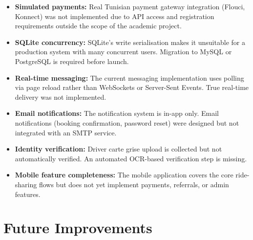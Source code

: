 \documentclass[12pt,a4paper,openright]{report}
\begin{document}
\begin{itemize}[noitemsep]
    \item \textbf{Simulated payments:} Real Tunisian payment gateway integration (Flouci, Konnect) was not implemented due to API access and registration requirements outside the scope of the academic project.
    \item \textbf{SQLite concurrency:} SQLite's write serialisation makes it unsuitable for a production system with many concurrent users. Migration to MySQL or PostgreSQL is required before launch.
    \item \textbf{Real-time messaging:} The current messaging implementation uses polling via page reload rather than WebSockets or Server-Sent Events. True real-time delivery was not implemented.
    \item \textbf{Email notifications:} The notification system is in-app only. Email notifications (booking confirmation, password reset) were designed but not integrated with an SMTP service.
    \item \textbf{Identity verification:} Driver carte grise upload is collected but not automatically verified. An automated OCR-based verification step is missing.
    \item \textbf{Mobile feature completeness:} The mobile application covers the core ride-sharing flows but does not yet implement payments, referrals, or admin features.
\end{itemize}

\section{Future Improvements}
\end{document}
